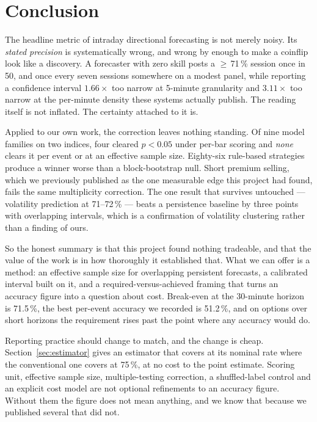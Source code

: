 \documentclass[conference]{IEEEtran}
\begin{document}
\section{Conclusion}

The headline metric of intraday directional forecasting is not merely noisy. Its
\emph{stated precision} is systematically wrong, and wrong by enough to make a
coinflip look like a discovery. A forecaster with zero skill posts a
$\geq$\,71\,\% session once in 50, and once every seven sessions somewhere on a
modest panel, while reporting a confidence interval $1.66\times$ too narrow at
5-minute granularity and $3.11\times$ too narrow at the per-minute density these
systems actually publish. The reading itself is not inflated. The certainty
attached to it is.

Applied to our own work, the correction leaves nothing standing. Of nine model
families on two indices, four cleared $p<0.05$ under per-bar scoring and
\emph{none} clears it per event or at an effective sample size. Eighty-six
rule-based strategies produce a winner worse than a block-bootstrap null. Short
premium selling, which we previously published as the one measurable edge this
project had found, fails the same multiplicity correction. The one result that
survives untouched --- volatility prediction at 71--72\,\% --- beats a
persistence baseline by three points with overlapping intervals, which is a
confirmation of volatility clustering rather than a finding of ours.

So the honest summary is that this project found nothing tradeable, and that
the value of the work is in how thoroughly it established that. What we can
offer is a method: an effective sample size for overlapping persistent
forecasts, a calibrated interval built on it, and a required-versus-achieved
framing that turns an accuracy figure into a question about cost. Break-even at
the 30-minute horizon is 71.5\,\%, the best per-event accuracy we recorded is
51.2\,\%, and on options over short horizons the requirement rises past the
point where any accuracy would do.

Reporting practice should change to match, and the change is cheap.
Section~\ref{sec:estimator} gives an estimator that covers at its nominal rate
where the conventional one covers at 75\,\%, at no cost to the point estimate.
Scoring unit, effective sample size, multiple-testing correction, a
shuffled-label control and an explicit cost model are not optional refinements
to an accuracy figure. Without them the figure does not mean anything, and we
know that because we published several that did not.
\end{document}
